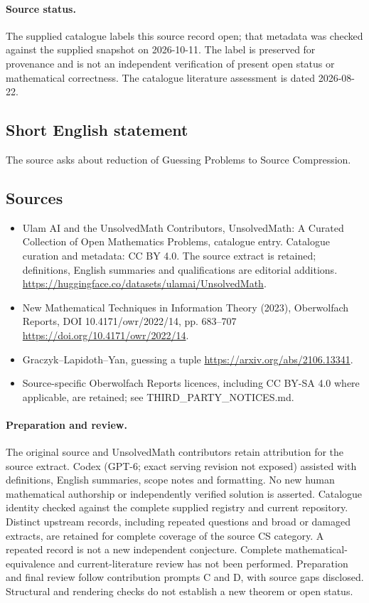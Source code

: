 \documentclass[11pt]{article}
\begin{document}
\paragraph{Source status.}
The supplied catalogue labels this source record open; that metadata was checked against the supplied snapshot on 2026-10-11. The label is preserved for provenance and is not an independent verification of present open status or mathematical correctness. The catalogue literature assessment is dated 2026-08-22.
\subsection{Short English statement}
The source asks about reduction of Guessing Problems to Source Compression.
\subsection{Sources}
\begin{itemize}
\item[S1] Ulam AI and the UnsolvedMath Contributors, UnsolvedMath: A Curated Collection of Open Mathematics Problems, catalogue entry. Catalogue curation and metadata: CC BY 4.0. The source extract is retained; definitions, English summaries and qualifications are editorial additions.
\url{https://huggingface.co/datasets/ulamai/UnsolvedMath}.
\item[S2] New Mathematical Techniques in Information Theory (2023), Oberwolfach Reports, DOI 10.4171/owr/2022/14, pp. 683--707
\url{https://doi.org/10.4171/owr/2022/14}.
\item[S3] Graczyk--Lapidoth--Yan, guessing a tuple
\url{https://arxiv.org/abs/2106.13341}.
\item Source-specific Oberwolfach Reports licences, including CC BY-SA 4.0 where applicable, are retained; see THIRD\_PARTY\_NOTICES.md.
\end{itemize}
\paragraph{Preparation and review.}
The original source and UnsolvedMath contributors retain attribution for the source extract. Codex (GPT-6; exact serving revision not exposed) assisted with definitions, English summaries, scope notes and formatting. No new human mathematical authorship or independently verified solution is asserted. Catalogue identity checked against the complete supplied registry and current repository. Distinct upstream records, including repeated questions and broad or damaged extracts, are retained for complete coverage of the source CS category. A repeated record is not a new independent conjecture. Complete mathematical-equivalence and current-literature review has not been performed. Preparation and final review follow contribution prompts C and D, with source gaps disclosed. Structural and rendering checks do not establish a new theorem or open status.
\label{end:statement}
\end{document}
